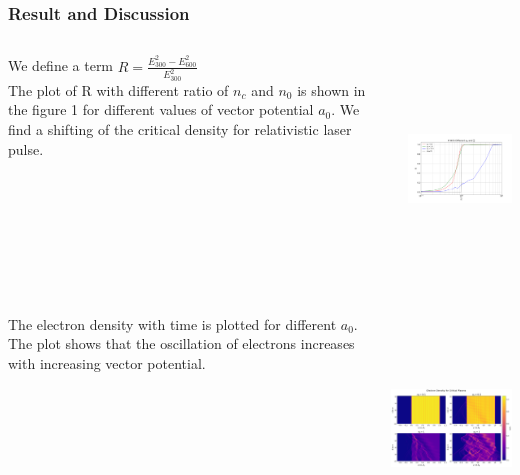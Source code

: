 \documentclass{beamer}
\begin{document}
{\begin{frame}
\end{frame}
\begin{frame}
    \frametitle{Result and Discussion}
    \small
    \begin{columns}
        \begin{column}{0.3\textwidth}
            We define a term
            $
                R= \frac{{E_{300}^2}-{E_{600}^2}}{{E_{300}^2}}
            $\\
            The plot of R with different ratio of $n_c$ and $n_0$ is shown in the figure 1 for different values of vector potential $a_0$. We find a shifting of the critical density for relativistic laser pulse.
        \end{column}
        \begin{column}{0.7\textwidth}
            \includegraphics[width=8cm, height=6cm]{reflection.png}
        \end{column}
    \end{columns}
\end{frame}
\begin{frame}
    \small
    \begin{columns}
        \begin{column}{0.3\textwidth}
            The electron density with time is plotted for different $a_0$. The plot shows that the oscillation of electrons increases with increasing vector potential.
        \end{column}
        \begin{column}{0.7\textwidth}
            \includegraphics[width=8cm, height=6cm]{density.png}

\end{column}
\end{columns}
\end{frame}}
\end{document}
